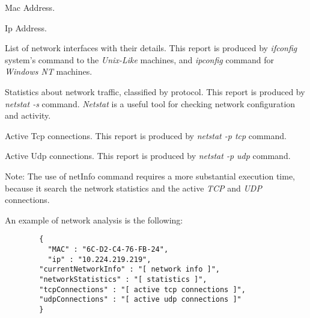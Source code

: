 \begin{description}
  \setlength\itemsep{1em}
  \item [Mac] Mac Address.
  \item [Ip] Ip Address.
  \item [CurrentNetworkInfo] List of network interfaces with their details. This report is produced by \textit{ifconfig} system's command to the \textit{Unix-Like} machines, and \textit{ipconfig} command for \textit{Windows NT} machines.
  \item [NetworkStatistics] Statistics about network traffic, classified by protocol. This report is produced by \textit{netstat -s} command. \textit{Netstat} is a useful tool for checking network configuration and activity.
  \item [TcpConnections] Active Tcp connections. This report is produced by \textit{netstat -p tcp} command.
  \item [UdpConnections] Active Udp connections. This report is produced by \textit{netstat -p udp} command.
 \end{description}

Note: The use of netInfo command requires a more substantial execution time, because it search the network statistics and the active \textit{TCP} and \textit{UDP} connections.

An example of network analysis is the following:

\begin{description}
	\item 
		\begin{verbatim}
		{
		  "MAC" : "6C-D2-C4-76-FB-24",
		  "ip" : "10.224.219.219",
	 	"currentNetworkInfo" : "[ network info ]",
	 	"networkStatistics" : "[ statistics ]",
	 	"tcpConnections" : "[ active tcp connections ]",
	 	"udpConnections" : "[ active udp connections ]"
		}
	\end{verbatim}
\end{description}
